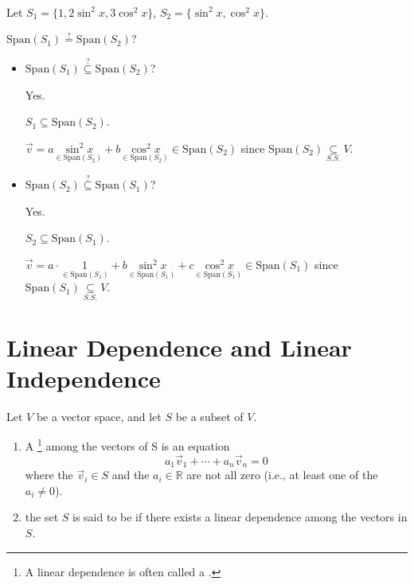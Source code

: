 \documentclass[11pt,fleqn]{book} %
\begin{document}
\begin{example}
{~~~}
    
    Let $S_1=\{ 1, 2\sin^2{x}, 3\cos^2{x} \}$, $S_2 = \{ \sin^2{x}, \cos^2{x} \}$. 
    
    $\mathrm{Span}(S_1) \overset{?}= \mathrm{Span}(S_2)$? 
    
    \begin{itemize}
        \item $\mathrm{Span}\left( S_1 \right) \overset{?}{\subseteq} \mathrm{Span}\left( S_2 \right)$? 
        
        {\color{lightblue} Yes. 
        
        $S_1 \subseteq \mathrm{Span}\left( S_2 \right)$. 
        
        $\vec{v} = a\underset{\in \mathrm{Span}\left( S_2 \right)}{\sin^2x}+b\underset{\in\mathrm{Span}\left( S_2 \right)}{\cos^2x} \in \mathrm{Span}\left( S_2 \right)$ since $\mathrm{Span}\left( S_2 \right) \underset{S.S.}{\subseteq} V$. }
        
        \item $\mathrm{Span}\left( S_2 \right) \overset{?}{\subseteq} \mathrm{Span}\left( S_1 \right)$? 
        
        {\color{lightblue} Yes. 
        
        $S_2 \subseteq \mathrm{Span}\left( S_1 \right)$. 
        
        $\vec{v} = a \cdot \underset{\in\mathrm{Span}\left( S_1 \right)}{1} + b \underset{\in \mathrm{Span}\left( S_1 \right)}{\sin^2x} + c \underset{\in\mathrm{Span}\left( S_1 \right)}{\cos^2x} \in \mathrm{Span}\left( S_1 \right)$ since $\mathrm{Span}\left( S_1 \right) \underset{S.S.}{\subseteq} V$. }

    \end{itemize}
\end{example}

\section{Linear Dependence and Linear Independence}

\setcounter{section}{4}
\setcounter{definitionT}{1}
\begin{definition}
    Let $V$ be a vector space, and let $S$ be a subset of $V$.
    
    \begin{enumerate}[label=\alph*)]
        \item A \footnote{A linear dependence is often called a . } among the vectors of S is an equation $$a_1\vec{v}_1 + \cdots + a_n\vec{v}_n = 0$$ where the $\vec{v}_i \in S$ and the $a_i \in \mathbb{R}$ are not all zero (i.e., at least one of the $a_i \neq 0$).

        \item the set $S$ is said to be  if there exists a linear dependence among the vectors in $S$.
    \end{enumerate} 
\end{definition}
\setcounter{section}{5}
\end{document}
